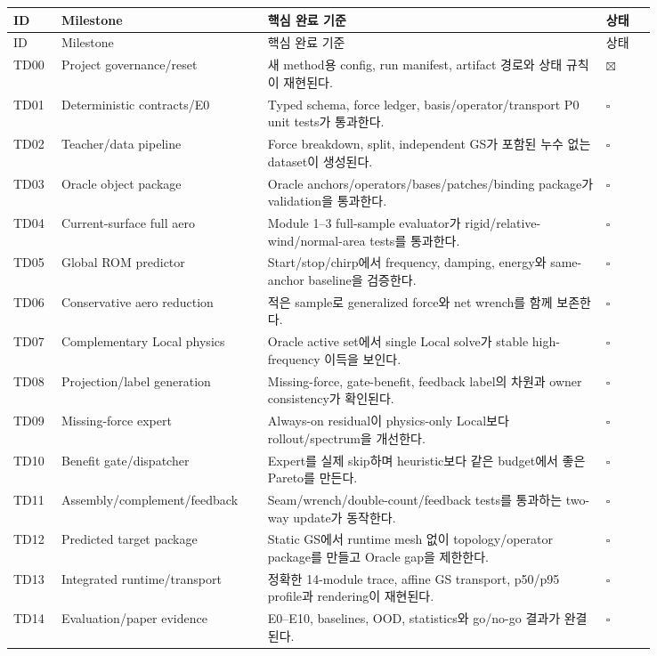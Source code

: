 \documentclass[10pt,a4paper]{article}
\newcommand{\todo}{\textcolor{TodoGray}{\(\square\)}}
\newcommand{\done}{\textcolor{DoneGreen}{\(\boxtimes\)}}
\begin{document}
\small
\begin{longtable}{L{0.065\linewidth}L{0.235\linewidth}L{0.47\linewidth}L{0.075\linewidth}}
\toprule
ID & Milestone & 핵심 완료 기준 & 상태 \\
\midrule
\endfirsthead
\toprule
ID & Milestone & 핵심 완료 기준 & 상태 \\
\midrule
\endhead
TD00 & Project governance/reset & 새 method용 config, run manifest, artifact 경로와 상태 규칙이 재현된다. & \done \\
TD01 & Deterministic contracts/E0 & Typed schema, force ledger, basis/operator/transport P0 unit tests가 통과한다. & \todo \\
TD02 & Teacher/data pipeline & Force breakdown, split, independent GS가 포함된 누수 없는 dataset이 생성된다. & \todo \\
TD03 & Oracle object package & Oracle anchors/operators/bases/patches/binding package가 validation을 통과한다. & \todo \\
TD04 & Current-surface full aero & Module 1--3 full-sample evaluator가 rigid/relative-wind/normal-area tests를 통과한다. & \todo \\
TD05 & Global ROM predictor & Start/stop/chirp에서 frequency, damping, energy와 same-anchor baseline을 검증한다. & \todo \\
TD06 & Conservative aero reduction & 적은 sample로 generalized force와 net wrench를 함께 보존한다. & \todo \\
TD07 & Complementary Local physics & Oracle active set에서 single Local solve가 stable high-frequency 이득을 보인다. & \todo \\
TD08 & Projection/label generation & Missing-force, gate-benefit, feedback label의 차원과 owner consistency가 확인된다. & \todo \\
TD09 & Missing-force expert & Always-on residual이 physics-only Local보다 rollout/spectrum을 개선한다. & \todo \\
TD10 & Benefit gate/dispatcher & Expert를 실제 skip하며 heuristic보다 같은 budget에서 좋은 Pareto를 만든다. & \todo \\
TD11 & Assembly/complement/feedback & Seam/wrench/double-count/feedback tests를 통과하는 two-way update가 동작한다. & \todo \\
TD12 & Predicted target package & Static GS에서 runtime mesh 없이 topology/operator package를 만들고 Oracle gap을 제한한다. & \todo \\
TD13 & Integrated runtime/transport & 정확한 14-module trace, affine GS transport, p50/p95 profile과 rendering이 재현된다. & \todo \\
TD14 & Evaluation/paper evidence & E0--E10, baselines, OOD, statistics와 go/no-go 결과가 완결된다. & \todo \\
\bottomrule
\end{longtable}
\normalsize
\end{document}
